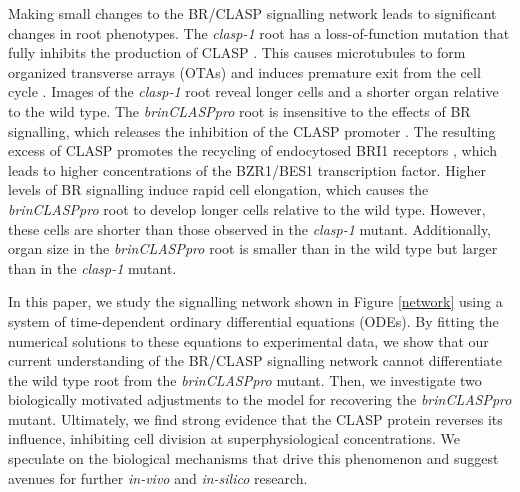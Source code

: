 \documentclass[referee,pdflatex,sn-mathphys-num]{sn-jnl}
\begin{document}
Making small changes to the BR/CLASP signalling network leads to significant changes in root phenotypes.
The \emph{clasp-1} root has a loss-of-function mutation that fully inhibits the production of CLASP \cite{ambrose2007}.
This causes microtubules to form organized transverse arrays (OTAs) and induces premature exit from the cell cycle \cite{halat2022}.
Images of the \emph{clasp-1} root reveal longer cells and a shorter organ relative to the wild type.
The \emph{brinCLASPpro} root is insensitive to the effects of BR signalling, which releases the inhibition of the CLASP promoter \cite{ruan2018}.
The resulting excess of CLASP promotes the recycling of endocytosed BRI1 receptors \cite{ruan2018}, which leads to higher concentrations of the BZR1/BES1 transcription factor.
Higher levels of BR signalling induce rapid cell elongation, which causes the \emph{brinCLASPpro} root to develop longer cells relative to the wild type.
However, these cells are shorter than those observed in the \emph{clasp-1} mutant.
Additionally, organ size in the \emph{brinCLASPpro} root is smaller than in the wild type but larger than in the \emph{clasp-1} mutant.

In this paper, we study the signalling network shown in Figure \ref{network} using a system of time-dependent ordinary differential equations (ODEs).
By fitting the numerical solutions to these equations to experimental data, we show that our current understanding of the BR/CLASP signalling network cannot differentiate the wild type root from the \emph{brinCLASPpro} mutant.
Then, we investigate two biologically motivated adjustments to the model for recovering the \emph{brinCLASPpro} mutant.
Ultimately, we find strong evidence that the CLASP protein reverses its influence, inhibiting cell division at superphysiological concentrations.
We speculate on the biological mechanisms that drive this phenomenon and suggest avenues for further \emph{in-vivo} and \emph{in-silico} research.
\end{document}

